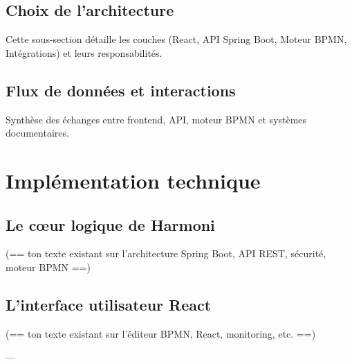 \subsection{Choix de l’architecture}
Cette sous-section détaille les couches (React, API Spring Boot, Moteur BPMN, Intégrations) et leurs responsabilités.

\subsection{Flux de données et interactions}
Synthèse des échanges entre frontend, API, moteur BPMN et systèmes documentaires.

\section{Implémentation technique}

\subsection{Le cœur logique de Harmoni}
(== ton texte existant sur l’architecture Spring Boot, API REST, sécurité, moteur BPMN ==)

\subsection{L’interface utilisateur React}
(== ton texte existant sur l’éditeur BPMN, React, monitoring, etc. ==)

---
